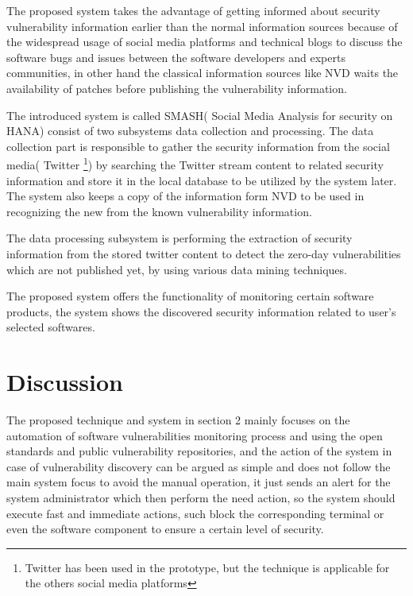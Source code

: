 \documentclass{llncs}
\begin{document}
The proposed system takes the advantage of getting informed about security vulnerability information earlier than the normal information sources because of the widespread usage of social media platforms and technical blogs to discuss the software bugs and issues between the software developers and experts communities, in other hand the classical information sources like NVD waits the availability of patches before publishing the vulnerability information.
\par The introduced system is called SMASH( Social Media Analysis for security on HANA) consist of two subsystems data collection and processing. The data collection part is responsible to gather the security information from the social media( Twitter \footnote{Twitter has been used in the prototype, but the technique is applicable for the others social media platforms}) by searching the Twitter stream content to related security information and store it in the local database to be utilized by the system later. The system also keeps a copy of the information form NVD to be used in recognizing the new from the known vulnerability information.
\par
The data processing subsystem is performing the extraction of security information from the stored twitter content to detect the zero-day vulnerabilities which are not published yet, by using various data mining techniques.

The proposed system offers the functionality of monitoring certain software products, the system shows the discovered security information related to user's selected softwares.
  

\section{Discussion}

\par The proposed technique and system in section 2 mainly focuses on the automation of software vulnerabilities monitoring process and using the open standards and public vulnerability repositories, and the action of the system in case of vulnerability  discovery can be argued as simple and does not follow the main system focus to avoid the manual operation, it just sends an alert for the system administrator which then perform the need action, so the system should execute fast and immediate actions, such block the corresponding terminal or even the software component to ensure a certain level of security. 
\end{document}
